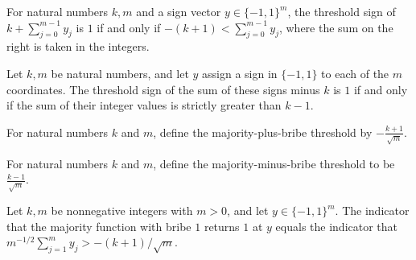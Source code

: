 \begin{theorem}
\label{FABL.thresholdSign_nat_add_sign_sum_eq_one_iff}
\leanok
{}
For natural numbers $k,m$ and a sign vector $y\in\{-1,1\}^m$, the threshold sign of
$k+\sum_{j=0}^{m-1}y_j$ is $1$ if and only if $-(k+1)<\sum_{j=0}^{m-1}y_j$, where the
sum on the right is taken in the integers.
\end{theorem}

\begin{theorem}
\label{FABL.thresholdSign_sign_sum_sub_nat_eq_one_iff}
\leanok
{}
Let $k,m$ be natural numbers, and let $y$ assign a sign in $\{-1,1\}$ to each of the $m$
coordinates. The threshold sign of the sum of these signs minus $k$ is $1$ if and only
if the sum of their integer values is strictly greater than $k-1$.
\end{theorem}

\begin{definition}
\label{FABL.majorityPlusBribeThreshold}
\leanok
For natural numbers $k$ and $m$, define the majority-plus-bribe threshold by
$-\frac{k+1}{\sqrt{m}}$.
\end{definition}

\begin{definition}
\label{FABL.majorityMinusBribeThreshold}
\leanok
For natural numbers $k$ and $m$, define the majority-minus-bribe threshold to be
$\frac{k-1}{\sqrt{m}}$.
\end{definition}

\begin{theorem}
\label{FABL.majorityAfterHeadBribe_one_indicator}
\leanok
{}
Let $k,m$ be nonnegative integers with $m>0$, and let $y\in\{−1,1\}^m$. The indicator
that the majority function with bribe $1$ returns $1$ at $y$ equals the indicator that
$m^{-1/2}\sum_{j=1}^m y_j>-(k+1)/\sqrt m$.
\end{theorem}

